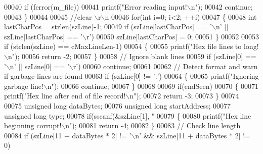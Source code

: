 \begin{DoxyCode}
{00040             \textcolor{keywordflow}{if} (ferror(m\_file))
00041                 printf(\textcolor{stringliteral}{"Error reading input!\(\backslash\)n"});
00042             \textcolor{keywordflow}{continue};
00043         \}
00044 
00045         \textcolor{comment}{//clear \(\backslash\)r\(\backslash\)n}
00046         \textcolor{keywordflow}{for}(\textcolor{keywordtype}{int} i=0; i<2; ++i)
00047         \{
00048             \textcolor{keywordtype}{int} lastCharPos = strlen(szLine)-1;
00049             \textcolor{keywordflow}{if} (szLine[lastCharPos] == \textcolor{charliteral}{'\(\backslash\)n'} || szLine[lastCharPos] == \textcolor{charliteral}{'\(\backslash\)r'})
00050                 szLine[lastCharPos] = 0;
00051         \}
00052 
00053         \textcolor{keywordflow}{if} (strlen(szLine) == cMaxLineLen-1)
00054         \{
00055             printf(\textcolor{stringliteral}{"Hex file lines to long!\(\backslash\)n"});
00056             \textcolor{keywordflow}{return} -2;
00057         \}
00058         \textcolor{comment}{// Ignore blank lines}
00059         \textcolor{keywordflow}{if} (szLine[0] == \textcolor{charliteral}{'\(\backslash\)n'} || szLine[0] == \textcolor{charliteral}{'\(\backslash\)r'})
00060             \textcolor{keywordflow}{continue};
00061 
00062         \textcolor{comment}{// Detect format and warn if garbage lines are found}
00063         \textcolor{keywordflow}{if} (szLine[0] != \textcolor{charliteral}{':'})
00064         \{
00065             printf(\textcolor{stringliteral}{"Ignoring garbage line!\(\backslash\)n"});
00066             \textcolor{keywordflow}{continue};
00067         \}
00068 
00069         \textcolor{keywordflow}{if}(endSeen)
00070         \{
00071             printf(\textcolor{stringliteral}{"Hex line after end of file record!\(\backslash\)n"});
00072             \textcolor{keywordflow}{return} -3;
00073         \}
00074 
00075         \textcolor{keywordtype}{unsigned} \textcolor{keywordtype}{long} dataBytes;
00076         \textcolor{keywordtype}{unsigned} \textcolor{keywordtype}{long} startAddress;
00077         \textcolor{keywordtype}{unsigned} \textcolor{keywordtype}{long} type;
00078         \textcolor{keywordflow}{if}(sscanf(&szLine[1], \textcolor{stringliteral}{"%
00079         \{
00080             printf(\textcolor{stringliteral}{"Hex line beginning corrupt!\(\backslash\)n"});
00081             \textcolor{keywordflow}{return} -4;
00082         \}
00083         \textcolor{comment}{// Check line length}
00084         \textcolor{keywordflow}{if} (szLine[11 + dataBytes * 2] != \textcolor{charliteral}{'\(\backslash\)n'} && szLine[11 + dataBytes * 2] != 0)
}}
\end{DoxyCode}
